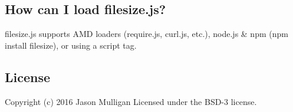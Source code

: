 \subsection*{How can I load filesize.\+js?}

filesize.\+js supports A\+MD loaders (require.\+js, curl.\+js, etc.), node.\+js \& npm (npm install filesize), or using a script tag.

\subsection*{License}

Copyright (c) 2016 Jason Mulligan Licensed under the B\+S\+D-\/3 license. 